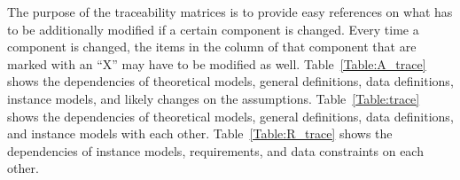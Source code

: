 \documentclass[12pt]{article}
\begin{document}
The purpose of the traceability matrices is to provide easy references on what has to be
additionally modified if a certain component is changed.  Every time a component is changed, the
items in the column of that component that are marked with an ``X'' may have to be modified as well.
Table~\ref{Table:A_trace} shows the dependencies of theoretical models, general definitions, data
definitions, instance models, and likely changes on the assumptions.  Table~\ref{Table:trace} shows
the dependencies of theoretical models, general definitions, data definitions, and instance models
with each other. Table~\ref{Table:R_trace} shows the dependencies of instance models, requirements,
and data constraints on each other.

 
\end{document}
